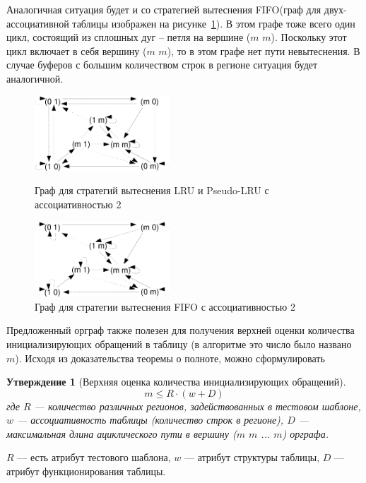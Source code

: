\documentclass[14pt]{extreport}
\newtheorem{utv}{Утверждение}
\newcommand{\LRU}{\textsf{LRU}\xspace}
\newcommand{\FIFO}{\textsf{FIFO}\xspace}
\newcommand{\PseudoLRU}{\textsf{Pseudo-LRU}\xspace}
\begin{document}
Аналогичная ситуация будет и со стратегией вытеснения \FIFO (граф
для двух-ассоциативной таблицы изображен на рисунке~\ref{fig:fifopolicy}). В
этом графе тоже всего один цикл, состоящий из сплошных дуг -- петля на вершине
($m$ $m$). Поскольку
этот цикл включает в себя вершину ($m$ $m$), то в этом графе нет
пути невытеснения. В случае буферов с большим количеством строк в регионе
ситуация будет аналогичной.

\begin{figure}[t]
\parbox{0.5\textwidth}{ \centering
  \includegraphics[width=0.45\textwidth]{2.theor/lrupolicy}
  \caption{Граф для стратегий вытеснения \LRU и \PseudoLRU с ассоциативностью 2}
  \label{fig:lrupolicy}
} \vline
\parbox{0.5\textwidth}{ \centering
  \includegraphics[width=0.45\textwidth]{2.theor/fifopolicy}
  \caption{Граф для стратегии вытеснения \FIFO с ассоциативностью 2}
  \label{fig:fifopolicy}
}
\end{figure}


Предложенный орграф также полезен для получения верхней оценки количества
инициализирующих обращений в таблицу (в алгоритме это число было названо $m$).
Исходя из доказательства теоремы о полноте, можно сформулировать

\begin{utv}[Верхняя оценка количества инициализирующих обращений]
$$m \leqslant R \cdot (w + D)$$
где $R$ --- количество различных регионов, задействованных в тестовом шаблоне,
$w$ --- ассоциативность таблицы (количество строк в регионе), $D$ ---
максимальная длина ациклического пути в вершину ($m$ $m$ ... $m$) орграфа.
\end{utv}

$R$ --- есть атрибут тестового шаблона, $w$ --- атрибут структуры таблицы, $D$
--- атрибут функционирования таблицы.
\end{document}
